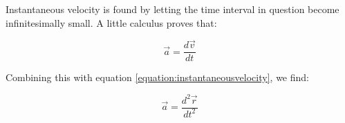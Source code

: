 Instantaneous velocity is found by letting the time interval in question become infinitesimally small.  A little calculus proves that:
\begin{mdframed}[backgroundcolor=orange!20!white]
	\begin{equation}
	\vec{a} = \frac{d \vec{v}}{dt} 
	\end{equation}
\end{mdframed}

Combining this with equation \eqref{equation:instantaneousvelocity}, we find:
\begin{mdframed}[backgroundcolor=orange!20!white]
	\begin{equation}
	\vec{a} = \frac{d^2 \vec{r}}{dt^2} 
	\end{equation}
\end{mdframed}


